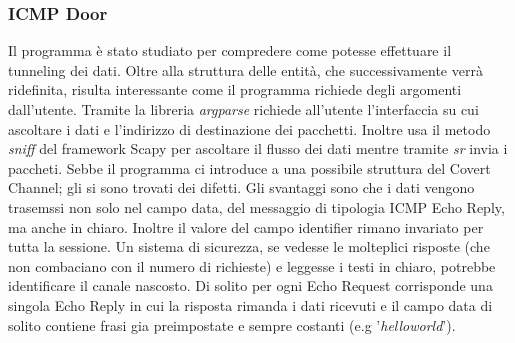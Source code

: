 \subsubsection*{ICMP Door}\label{strumenti:ICMPdoor} %
Il programma \cite{icmp-door} è stato studiato per compredere come potesse effettuare il tunneling dei dati. 
Oltre alla struttura delle entità, che successivamente verrà ridefinita, risulta interessante come il programma richiede degli argomenti dall'utente. 
Tramite la libreria \textit{argparse} richiede all'utente l'interfaccia su cui ascoltare i dati e l'indirizzo di destinazione dei pacchetti. 
Inoltre usa il metodo \textit{sniff} del framework Scapy per ascoltare il flusso dei dati mentre tramite \textit{sr} invia i paccheti. 
\vspace{2ex} \newline 
Sebbe il programma ci introduce a una possibile struttura del Covert Channel; gli si sono trovati dei difetti. 
Gli svantaggi sono che i dati vengono trasemssi non solo nel campo data, del messaggio di tipologia ICMP Echo Reply, ma anche in chiaro. 
Inoltre il valore del campo identifier rimano invariato per tutta la sessione. 
Un sistema di sicurezza, se vedesse le molteplici risposte (che non combaciano con il numero di richieste) e leggesse i testi in chiaro, potrebbe identificare il canale nascosto. 
Di solito per ogni Echo Request corrisponde una singola Echo Reply in cui la risposta rimanda i dati ricevuti e il campo data di solito contiene frasi gia preimpostate e sempre costanti (e.g '\textit{helloworld}'). 


